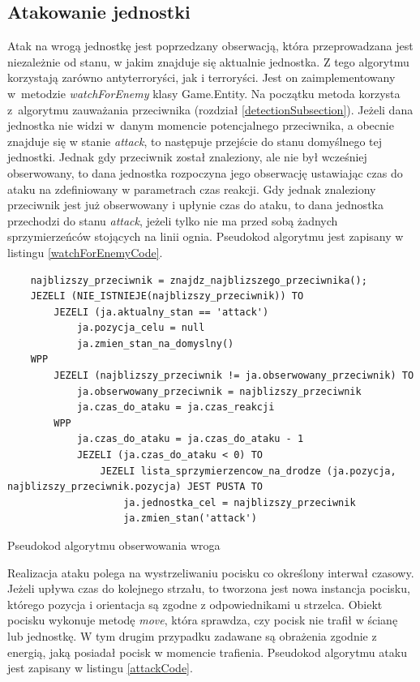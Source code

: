 \subsection{Atakowanie jednostki}
Atak na wrogą jednostkę jest poprzedzany obserwacją, która przeprowadzana jest niezależnie od stanu, w jakim znajduje się aktualnie jednostka. Z tego algorytmu korzystają zarówno antyterroryści, jak i terroryści. Jest on zaimplementowany w~metodzie \emph{watchForEnemy} klasy Game.Entity. Na początku metoda korzysta z~algorytmu zauważania przeciwnika (rozdział \ref{detectionSubsection}). Jeżeli dana jednostka nie widzi w~danym momencie potencjalnego przeciwnika, a obecnie znajduje się w stanie \emph{attack}, to następuje przejście do stanu domyślnego tej jednostki. Jednak gdy przeciwnik został znaleziony, ale nie był wcześniej obserwowany, to dana jednostka rozpoczyna jego obserwację ustawiając czas do ataku na zdefiniowany w parametrach czas reakcji. Gdy jednak znaleziony przeciwnik jest już obserwowany i upłynie czas do ataku, to dana jednostka przechodzi do stanu \emph{attack}, jeżeli tylko nie ma przed sobą żadnych sprzymierzeńców stojących na linii ognia. Pseudokod algorytmu jest zapisany w listingu \ref{watchForEnemyCode}.

\begin{table}
\begin{center}
\begin{lstlisting}
	najblizszy_przeciwnik = znajdz_najblizszego_przeciwnika();
	JEZELI (NIE_ISTNIEJE(najblizszy_przeciwnik)) TO
		JEZELI (ja.aktualny_stan == 'attack')
			ja.pozycja_celu = null
			ja.zmien_stan_na_domyslny()
	WPP
		JEZELI (najblizszy_przeciwnik != ja.obserwowany_przeciwnik) TO
			ja.obserwowany_przeciwnik = najblizszy_przeciwnik
			ja.czas_do_ataku = ja.czas_reakcji
		WPP
			ja.czas_do_ataku = ja.czas_do_ataku - 1
			JEZELI (ja.czas_do_ataku < 0) TO
				JEZELI lista_sprzymierzencow_na_drodze (ja.pozycja, najblizszy_przeciwnik.pozycja) JEST PUSTA TO
					ja.jednostka_cel = najblizszy_przeciwnik
					ja.zmien_stan('attack')									
\end{lstlisting}
\caption {Pseudokod algorytmu obserwowania wroga}
\label{watchForEnemyCode}
\end{center}
\end{table}

Realizacja ataku polega na wystrzeliwaniu pocisku co określony interwał czasowy. Jeżeli upływa czas do kolejnego strzału, to tworzona jest nowa instancja pocisku, którego pozycja i orientacja są zgodne z odpowiednikami u strzelca. Obiekt pocisku wykonuje metodę \emph{move}, która sprawdza, czy pocisk nie trafił w ścianę lub jednostkę. W tym drugim przypadku zadawane są obrażenia zgodnie z energią, jaką posiadał pocisk w momencie trafienia. Pseudokod algorytmu ataku jest zapisany w listingu \ref{attackCode}.

